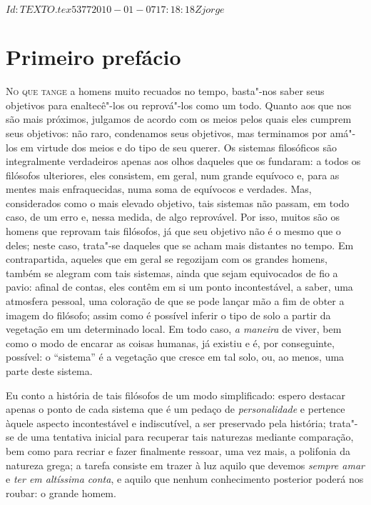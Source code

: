 \SVN $Id: TEXTO.tex 5377 2010-01-07 17:18:18Z jorge $	

\chapter{Primeiro prefácio}

\textsc{No que tange} a homens muito recuados no tempo, basta"-nos saber
seus objetivos para enaltecê"-los ou reprová"-los como um todo. Quanto
aos que nos são mais próximos, julgamos de acordo com os meios pelos
quais eles cumprem seus objetivos: não raro, condenamos seus objetivos,
mas terminamos por amá"-los em virtude dos meios e do tipo de seu
querer. Os sistemas filosóficos são integralmente verdadeiros apenas
aos olhos daqueles que os fundaram: a todos os filósofos ulteriores,
eles consistem, em geral, num grande equívoco e, para as mentes mais
enfraquecidas, numa soma de equívocos e verdades. Mas, considerados
como o mais elevado objetivo, tais sistemas não passam, em todo caso,
de um erro e, nessa medida, de algo reprovável. Por isso, muitos são
os homens que reprovam tais filósofos, já que seu objetivo não é o
mesmo que o deles; neste caso, trata"-se daqueles que se acham mais
distantes no tempo. Em contrapartida, aqueles que em geral se regozijam
com os grandes homens, também se alegram com tais sistemas, ainda que
sejam equivocados de fio a pavio: afinal de contas, eles contêm em si
um ponto incontestável, a saber, uma atmosfera pessoal, uma coloração \label{atmosferapessoal}
de que se pode lançar mão a fim de obter a imagem do filósofo; assim como
é possível inferir o tipo de solo a partir da vegetação em um determinado local. \label{possivelinferir}
Em todo caso, \textit{a maneira} de viver, bem como o modo de encarar as coisas \label{amaneirade}
humanas, já existiu e é, por conseguinte, possível: o ``sistema'' é a
vegetação que cresce em tal solo, ou, ao menos, uma parte deste sistema. 

Eu conto a história de tais filósofos de um modo simplificado: espero destacar \label{simplificado}
apenas o ponto de cada sistema que é um pedaço de
\textit{personalidade} e pertence àquele aspecto incontestável e
indiscutível, a ser preservado pela história; trata"-se de
uma tentativa inicial para recuperar tais naturezas mediante \label{comparacao}
comparação, bem como para recriar e fazer finalmente ressoar, uma vez
mais, a polifonia da natureza grega; a tarefa consiste em trazer à luz
aquilo que devemos \textit{sempre amar} e \textit{ter em altíssima conta}, 
e aquilo que nenhum conhecimento posterior poderá nos roubar: o \label{ograndehomem}
grande homem.


